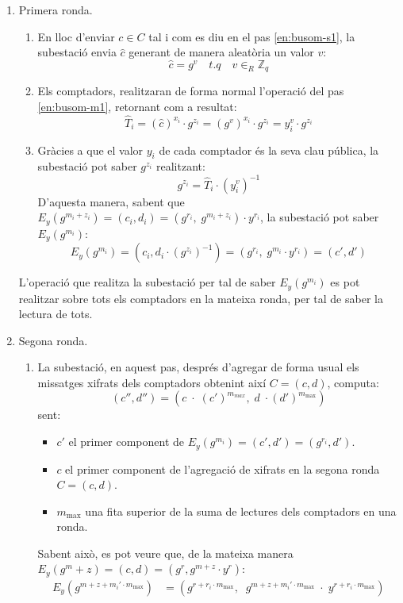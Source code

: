 \begin{enumerate}
	\item Primera ronda.
	\begin{enumerate}
		\item En lloc d'enviar $c \in C$ tal i com es diu en el pas \ref{en:busom-s1}, la subestació envia $\hat{c}$ generant de manera aleatòria un valor $v$:
		\[\hat{c} = g^v \quad t.q \quad v \in_R {\mathbb{Z}_{q}}\]
		\item Els comptadors, realitzaran de forma normal l'operació del pas \ref{en:busom-m1}, retornant com a resultat:
		\[\hat{T}_i = (\hat{c})^{x_i} \cdot g^{z_i} = (g^v)^{x_i} \cdot g^{z_i} = y_i^v \cdot g^{z_i}\]
		\item Gràcies a que el valor $y_i$ de cada comptador és la seva clau pública, la subestació pot saber $g^{z_i}$ realitzant:
		\[g^{z_i} = \hat{T}_i \cdot (y_i^v)^{-1}\]
		D'aquesta manera, sabent que $E_y(g^{m_i + z_i}) = (c_i, d_i) = (g^{r_i}, \; g^{m_i + z_i}) \cdot y^{r_i}$, la subestació pot saber $E_y(g^{m_i})$:
		\[E_y(g^{m_i}) = (c_i, d_i \cdot (g^{z_i})^{-1}) = (g^{r_i}, \; g^{m_i} \cdot y^{r_i}) = (c', d')\]
	\end{enumerate}
	L'operació que realitza la subestació per tal de saber $E_y(g^{m_i})$ es pot realitzar sobre tots els comptadors en la mateixa ronda, per tal de saber la lectura de tots.
	\item Segona ronda.
	\begin{enumerate}
		\item La subestació, en aquest pas, després d'agregar de forma usual els missatges xifrats dels comptadors obtenint així $C = (c, d)$, computa:
		\[(c'', d'') = (c \; \cdot \; (c')^{m_{max}}, \; d \; \cdot (d')^{m_{\textrm{max}}})\]
		sent:
		\begin{itemize}
			\item $c'$ el primer component de $E_y(g^{m_i}) = (c', d') = (g^{r_i}, d')$.
			\item $c$ el primer component de l'agregació de xifrats en la segona ronda $C = (c,d)$.
			\item $m_{\textrm{max}}$ una fita superior de la suma de lectures dels comptadors en una ronda.
		\end{itemize}
		Sabent això, es pot veure que, de la mateixa manera $E_y(g^m+z) = (c, d) = (g^r, g^{m+z} \cdot y^r)$:
		\begin{align*}
		E_y(g^{m + z + m_i'\cdot m_{\textrm{max}}}) &= (g^{r + r_i \cdot m_{\textrm{max}}}, \;\; g^{m + z + m_i' \cdot m_{\textrm{max}}} \; \cdot \; y^{r + r_i \cdot m_{\textrm{max}}}) \\

\end{align*}
\end{enumerate}
\end{enumerate}
